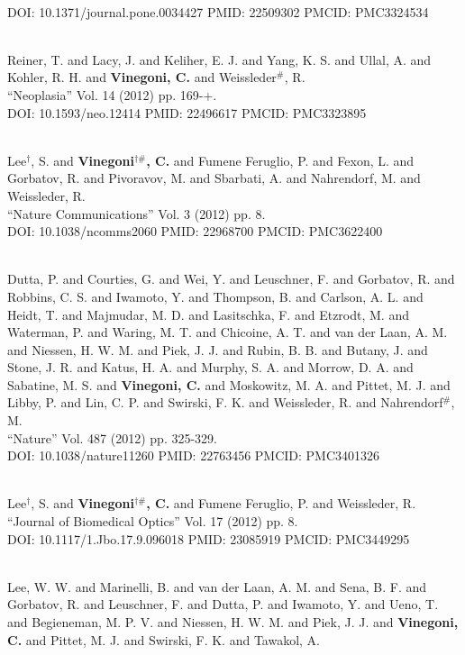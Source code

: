 \\ DOI: 10.1371/journal.pone.0034427 PMID: 22509302 PMCID: PMC3324534\item {} \\ Reiner, T. and Lacy, J. and Keliher, E. J. and Yang, K. S. and Ullal, A. and Kohler, R. H. and {\bf Vinegoni, C.} and Weissleder$^\#$, R. \\ ``Neoplasia'' Vol. 14 (2012) pp. 169-+. \\ DOI: 10.1593/neo.12414 PMID: 22496617 PMCID: PMC3323895\item {} \\ Lee$^\dag$, S. and {\bf Vinegoni$^{\dag \#}$, C.} and Fumene Feruglio, P. and Fexon, L. and Gorbatov, R. and Pivoravov, M. and Sbarbati, A. and Nahrendorf, M. and Weissleder, R. \\ ``Nature Communications'' Vol. 3 (2012) pp. 8. \\ DOI: 10.1038/ncomms2060 PMID: 22968700 PMCID: PMC3622400\item {} \\ Dutta, P. and Courties, G. and Wei, Y. and Leuschner, F. and Gorbatov, R. and Robbins, C. S. and Iwamoto, Y. and Thompson, B. and Carlson, A. L. and Heidt, T. and Majmudar, M. D. and Lasitschka, F. and Etzrodt, M. and Waterman, P. and Waring, M. T. and Chicoine, A. T. and van der Laan, A. M. and Niessen, H. W. M. and Piek, J. J. and Rubin, B. B. and Butany, J. and Stone, J. R. and Katus, H. A. and Murphy, S. A. and Morrow, D. A. and Sabatine, M. S. and {\bf Vinegoni, C.} and Moskowitz, M. A. and Pittet, M. J. and Libby, P. and Lin, C. P. and Swirski, F. K. and Weissleder, R. and Nahrendorf$^\#$, M. \\ ``Nature'' Vol. 487 (2012) pp. 325-329. \\ DOI: 10.1038/nature11260 PMID: 22763456 PMCID: PMC3401326\item {} \\ Lee$^\dag$, S. and {\bf Vinegoni$^{\dag \#}$, C.} and Fumene Feruglio, P. and Weissleder, R. \\ ``Journal of Biomedical Optics'' Vol. 17 (2012) pp. 8. \\ DOI: 10.1117/1.Jbo.17.9.096018 PMID: 23085919 PMCID: PMC3449295\item {} \\ Lee, W. W. and Marinelli, B. and van der Laan, A. M. and Sena, B. F. and Gorbatov, R. and Leuschner, F. and Dutta, P. and Iwamoto, Y. and Ueno, T. and Begieneman, M. P. V. and Niessen, H. W. M. and Piek, J. J. and {\bf Vinegoni, C.} and Pittet, M. J. and Swirski, F. K. and Tawakol, A. 